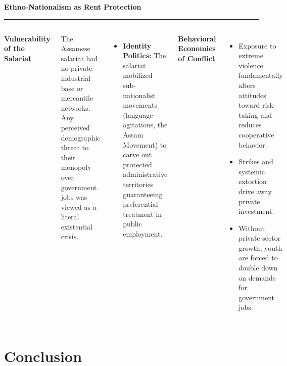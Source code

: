 \documentclass[aspectratio=169, 10pt]{beamer}
\newcommand{\slidetitle}[1]{%
  \vspace{-4pt}%
  {\usebeamerfont{frametitle}\Large\color{ink}\textbf{#1}}%
  \par\vspace{2pt}%
  {\color{clay}\rule{40pt}{2pt}}%
  \par\vspace{8pt}%
}
\newcommand{\infobox}[2]{%
  \begin{minipage}{\textwidth}
    {\bfseries\color{deepgreen}#1}\par\vspace{3pt}%
    \color{ink}#2
  \end{minipage}\par
}
\newcommand{\critiquebox}[2]{%
  \begin{minipage}{\textwidth}
    {\bfseries\color{burgundy}#1}\par\vspace{3pt}%
    \color{ink}#2
  \end{minipage}\par
}
\begin{document}
\begin{frame}
\slidetitle{Ethno-Nationalism as Rent Protection}

\begin{columns}[T]
\critiquebox{Vulnerability of the Salariat}{%
  The Assamese salariat had no private industrial base or mercantile networks. Any perceived demographic threat to their monopoly over government jobs was viewed as a literal existential crisis.
}

\vspace{6pt}
\begin{itemize}
  \item \textbf{Identity Politics:} The salariat mobilized sub-nationalist movements (language agitations, the Assam Movement) to carve out protected administrative territories guaranteeing preferential treatment in public employment.
\end{itemize}

\vspace{2pt}
\infobox{Behavioral Economics of Conflict}{%
  \begin{itemize}
    \item[{\color{deepgreen}\rule[0.4ex]{4pt}{0.8pt}}] Exposure to extreme violence fundamentally alters attitudes toward risk-taking and reduces cooperative behavior.
    \item[{\color{deepgreen}\rule[0.4ex]{4pt}{0.8pt}}] Strikes and systemic extortion drive away private investment.
    \item[{\color{deepgreen}\rule[0.4ex]{4pt}{0.8pt}}] Without private sector growth, youth are forced to double down on demands for government jobs.
  \end{itemize}%
}
\end{columns}
\end{frame}

\section{Conclusion}
\end{document}
